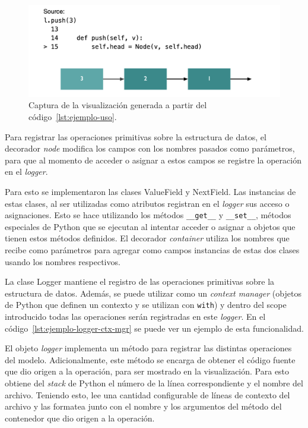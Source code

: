 \begin{figure}[h!]
    \centering
    \includegraphics[width=\linewidth]{imagenes/ejemplos/ejemplo}
    \caption{Captura de la visualización generada a partir del código~\ref{lst:ejemplo-uso}.}
    \label{fig:visualizacion_ej}
    \centering
\end{figure}

Para registrar las operaciones primitivas sobre la estructura de datos, el decorador \textit{node} modifica los campos con los nombres pasados como parámetros, para que al momento de acceder o asignar a estos campos se registre la operación en el \textit{logger}.

Para esto se implementaron las clases ValueField y NextField. Las instancias de estas clases, al ser utilizadas como atributos registran en el \textit{logger} sus acceso o asignaciones. Esto se hace utilizando los métodos \texttt{\_\_get\_\_} y \texttt{\_\_set\_\_}, métodos especiales de Python que se ejecutan al intentar acceder o asignar a objetos que tienen estos métodos definidos. El decorador \textit{container} utiliza los nombres que recibe como parámetros para agregar como campos instancias de estas dos clases usando los nombres respectivos.

La clase Logger mantiene el registro de las operaciones primitivas sobre la estructura de datos. Además, se puede utilizar como un \textit{context manager} (objetos de Python que definen un contexto y se utilizan con \texttt{with}) y dentro del scope introducido todas las operaciones serán registradas en este \textit{logger}. En el código~\ref{lst:ejemplo-logger-ctx-mgr} se puede ver un ejemplo de esta funcionalidad.

El objeto \textit{logger} implementa un método para registrar las distintas operaciones del modelo. Adicionalmente, este método se encarga de obtener el código fuente que dio origen a la operación, para ser mostrado en la visualización. Para esto obtiene del \textit{stack} de Python el número de la línea correspondiente y el nombre del archivo. Teniendo esto, lee una cantidad configurable de líneas de contexto del archivo y las formatea junto con el nombre y los argumentos del método del contenedor que dio origen a la operación.

